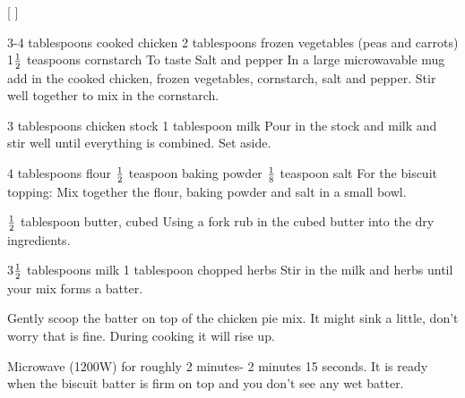 
[
]

\begin{step}
3-4 tablespoons cooked chicken
2 tablespoons frozen vegetables (peas and carrots)
1$\frac{1}{2}$ teaspoons cornstarch
To taste Salt and pepper
\method
In a large microwavable mug add in the cooked chicken, frozen vegetables, cornstarch, salt and pepper. Stir well together to mix in the cornstarch.
\end{step}

\begin{step}
3 tablespoons chicken stock
1 tablespoon milk
\method
Pour in the stock and milk and stir well until everything is combined. Set aside.
\end{step}

\begin{step}
4 tablespoons flour
$\frac{1}{2}$ teaspoon baking powder
$\frac{1}{8}$ teaspoon salt
\method
For the biscuit topping: Mix together the flour, baking powder and salt in a small bowl.
\end{step}

\begin{step}
$\frac{1}{2}$ tablespoon butter, cubed
\method
Using a fork rub in the cubed butter into the dry ingredients.
\end{step}

\begin{step}
3$\frac{1}{2}$ tablespoons milk
1 tablespoon chopped herbs
\method
Stir in the milk and herbs until your mix forms a batter.

Gently scoop the batter on top of the chicken pie mix. It might sink a little, don’t worry that is fine. During cooking it will rise up.

Microwave (1200W) for roughly 2 minutes- 2 minutes 15 seconds. It is ready when the biscuit batter is firm on top and you don’t see any wet batter.
\end{step}